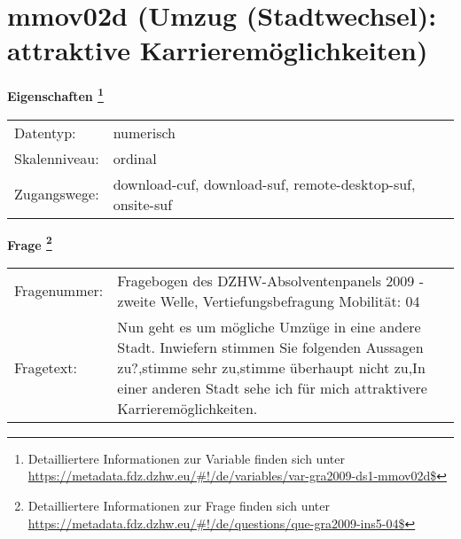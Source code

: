 
    \setcounter{footnote}{0}

    \vspace*{-1.8cm}
	\section{mmov02d (Umzug (Stadtwechsel): attraktive Karrieremöglichkeiten)}
	\label{section:mmov02d}



    \vspace*{0.5cm}
    \noindent\textbf{Eigenschaften
	\footnote{Detailliertere Informationen zur Variable finden sich unter
		\url{https://metadata.fdz.dzhw.eu/\#!/de/variables/var-gra2009-ds1-mmov02d$}}}\\
	\begin{tabularx}{\hsize}{@{}lX}
	Datentyp: & numerisch \\
	Skalenniveau: & ordinal \\
	Zugangswege: &
	  download-cuf, 
	  download-suf, 
	  remote-desktop-suf, 
	  onsite-suf
 \\
    \end{tabularx}



				\vspace*{0.5cm}
                \noindent\textbf{Frage
	                \footnote{Detailliertere Informationen zur Frage finden sich unter
		              \url{https://metadata.fdz.dzhw.eu/\#!/de/questions/que-gra2009-ins5-04$}}}\\
				\begin{tabularx}{\hsize}{@{}lX}
					Fragenummer: &
					  Fragebogen des DZHW-Absolventenpanels 2009 - zweite Welle, Vertiefungsbefragung Mobilität:
					  04
 \\
					Fragetext: & Nun geht es um mögliche Umzüge in eine andere Stadt. Inwiefern stimmen Sie folgenden Aussagen zu?,stimme sehr zu,stimme überhaupt nicht zu,In einer anderen Stadt sehe ich für mich attraktivere Karrieremöglichkeiten. \\
				\end{tabularx}






